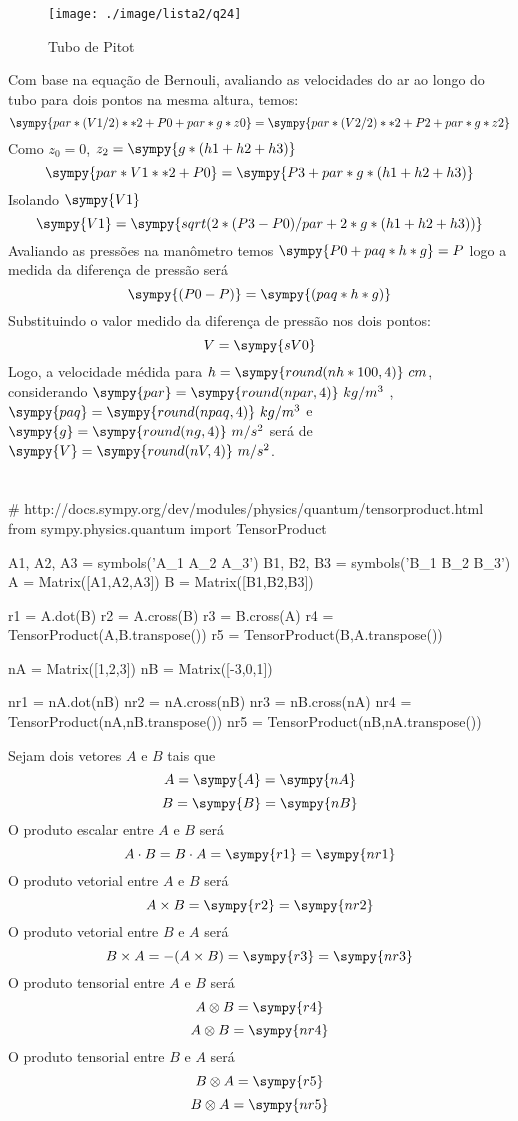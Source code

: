 \documentclass[a4paper,twocolumn,11pt]{article}
\newcommand{\npy}[1]{\sympy{round(n#1,4)}}
\newcommand{\nnpy}[1]{\sympy{#1} = \sympy{round(n#1,4)}}
\begin{document}
\begin{figure}[H]
\centering
\label{fig:l2q24}
\texttt{[image: ./image/lista2/q24]}
\caption{Tubo de Pitot}
\end{figure}
Com base na equação de Bernouli, avaliando as velocidades do ar ao longo do tubo para dois pontos na mesma altura, temos:
$$
\sympy{par*(V1/2)**2 +P0 + par*g*z0} = \sympy{par*(V2/2)**2 +P2 + par*g*z2}
$$
Como $z_0=0$, $z_2=\sympy{g*(h1+h2+h3)}$
$$
\sympy{par*V1**2 +P0} = \sympy{P3 + par*g*(h1+h2+h3)}
$$
Isolando $\sympy{V1}$
\begin{equation}
\sympy{V1} = \sympy{sqrt(2*(P3-P0)/par+2*g*(h1+h2+h3))}
\end{equation}
Avaliando as pressões na manômetro temos $ \sympy{P0 + paq*h*g} = P$ logo a medida da diferença de pressão será
\begin{equation}
\sympy{(P0 - P)} = \sympy{(paq*h*g)}
\end{equation}
Substituindo o valor medido da diferença de pressão nos dois pontos:
\begin{equation}
V= \sympy{sV0}
\end{equation}
Logo, a velocidade médida para $h = \npy{h*100}\ cm$, considerando $\nnpy{par}\ kg/m^3$ , $\nnpy{paq}\ kg/m^3$ e $\nnpy{g}\ m/s^2$ será de $\nnpy{V}\ m/s^2$.

\section{} %
\begin{sympycode}
# http://docs.sympy.org/dev/modules/physics/quantum/tensorproduct.html
from sympy.physics.quantum import TensorProduct

A1, A2, A3 = symbols('A_1 A_2 A_3')
B1, B2, B3 = symbols('B_1 B_2 B_3')
A = Matrix([A1,A2,A3])
B = Matrix([B1,B2,B3])

r1 = A.dot(B)
r2 = A.cross(B)
r3 = B.cross(A)
r4 = TensorProduct(A,B.transpose())
r5 = TensorProduct(B,A.transpose())

nA = Matrix([1,2,3])
nB = Matrix([-3,0,1])

nr1 = nA.dot(nB)
nr2 = nA.cross(nB)
nr3 = nB.cross(nA)
nr4 = TensorProduct(nA,nB.transpose())
nr5 = TensorProduct(nB,nA.transpose())
\end{sympycode}

Sejam dois vetores $A$ e $B$ tais que 
$$A = \sympy{A} = \sympy{nA}$$
$$B = \sympy{B} = \sympy{nB}$$
O produto escalar entre $A$ e $B$ será
$$A\cdot B = B\cdot A = \sympy{r1} = \sympy{nr1}$$
O produto vetorial entre $A$ e $B$ será
$$A\times B = \sympy{r2} = \sympy{nr2}$$
O produto vetorial entre $B$ e $A$ será
$$B\times A = -(A\times B) = \sympy{r3} = \sympy{nr3}$$
O produto tensorial entre $A$ e $B$ será
$$A\otimes B = \sympy{r4} $$
$$A\otimes B = \sympy{nr4}$$
O produto tensorial entre $B$ e $A$ será
$$B\otimes A = \sympy{r5}$$
$$B\otimes A = \sympy{nr5}$$
\end{document}
